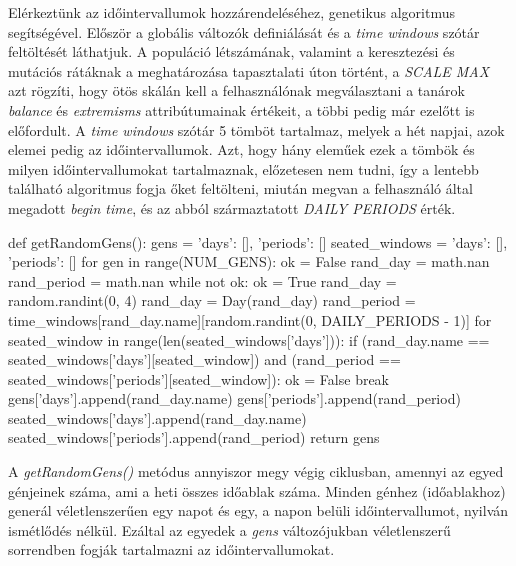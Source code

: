 \documentclass[12pt,a4paper]{report}
\begin{document}
Elérkeztünk az időintervallumok hozzárendeléséhez, genetikus algoritmus segítségével. Először a globális változók definiálását és a \textsl{time windows} szótár feltöltését láthatjuk. A populáció létszámának, valamint a keresztezési és mutációs rátáknak a meghatározása tapasztalati úton történt, a \textsl{SCALE MAX} azt rögzíti, hogy ötös skálán kell a felhasználónak megválasztani a tanárok \textsl{balance} és \textsl{extremisms} attribútumainak értékeit, a többi pedig már ezelőtt is előfordult. A \textsl{time windows} szótár 5 tömböt tartalmaz, melyek a hét napjai, azok elemei pedig az időintervallumok. Azt, hogy hány eleműek ezek a tömbök és milyen időintervallumokat tartalmaznak, előzetesen nem tudni, így a lentebb található algoritmus fogja őket feltölteni, miután megvan a felhasználó által megadott \textsl{begin time}, és az abból származtatott \textsl{DAILY PERIODS} érték.

\begin{python}
def getRandomGens():
    gens = {'days': [], 'periods': []}
    seated_windows = {'days': [], 'periods': []}
    for gen in range(NUM_GENS):
        ok = False
        rand_day = math.nan
        rand_period = math.nan
        while not ok:
            ok = True
            rand_day = random.randint(0, 4)
            rand_day = Day(rand_day)
            rand_period = time_windows[rand_day.name][random.randint(0, DAILY_PERIODS - 1)]
            for seated_window in range(len(seated_windows['days'])):
                if (rand_day.name == seated_windows['days'][seated_window]) and (rand_period == seated_windows['periods'][seated_window]):
                    ok = False
                    break
        gens['days'].append(rand_day.name)
        gens['periods'].append(rand_period)
        seated_windows['days'].append(rand_day.name)
        seated_windows['periods'].append(rand_period)
    return gens
\end{python}

A \textsl{getRandomGens()} metódus annyiszor megy végig ciklusban, amennyi az egyed génjeinek száma, ami a heti összes időablak száma. Minden génhez (időablakhoz) generál véletlenszerűen egy napot és egy, a napon belüli időintervallumot, nyilván ismétlődés nélkül. Ezáltal az egyedek a \textsl{gens} változójukban véletlenszerű sorrendben fogják tartalmazni az időintervallumokat.
\end{document}
